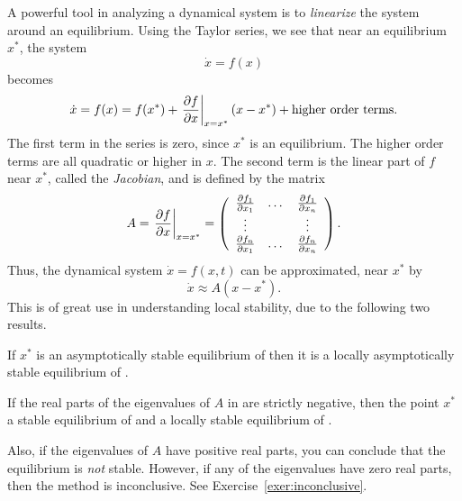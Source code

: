 A powerful tool in analyzing a dynamical system is to {\em linearize}
the system around an equilibrium. Using the Taylor series, we see that
near an equilibrium $x^*$, the system
%
\begin{equation} \label{eqn:ode-not}
\dot x = f(x) 
\end{equation}
%
becomes
%
$$
\dot x = f(x) = f(x^*) + \left . \frac{\partial f}{\partial x} \right |_{x=x^*} (x - x^*)
       + \mathrm{higher\ order \ terms}. 
$$
The first term in the series is zero, since $x^*$ is an
equilibrium. The higher order terms are all quadratic or higher in
$x$. The second term is the linear part of $f$ near $x^*$, called the
{\em Jacobian}, and is defined by the matrix
%
\begin{equation}\label{eqn:jac}
A = \left . \frac{\partial f}{\partial x} \right |_{x=x^*} = \left (
\begin{array}{ccc}
\frac{\partial f_1}{\partial x_1}  & \dots & \frac{\partial f_1}{\partial x_n} \\
\vdots & & \vdots \\
\frac{\partial f_n}{\partial x_1} & \dots & \frac{\partial f_n}{\partial x_n} 
\end{array}
\right ) .
\end{equation}
%
Thus, the dynamical system $\dot x = f(x,t)$ can be approximated, near $x^*$ by
%
\begin{equation}\label{eqn:linear}
\dot x \approx A ( x - x^* ) .
\end{equation}
%
This is of great use in understanding local stability, due to the following two results. 

\begin{theorem} \label{thm:linear-to-nonlinear} If $x^*$ is an
  asymptotically stable equilibrium of  then it is a
  locally asymptotically stable equilibrium of .
\end{theorem}

\begin{theorem}  \label{thm:linear-to-nonlinear} If the real parts of the
  eigenvalues of $A$ in  are strictly negative, then
  the point $x^*$ a stable equilibrium of  and a
  locally stable equilibrium of . 
\end{theorem}

Also, if the eigenvalues of $A$ have positive real parts, you can
conclude that the equilibrium is {\em not} stable. However, if any of
the eigenvalues have zero real parts, then the method is
inconclusive. See Exercise~\ref{exer:inconclusive}. 

